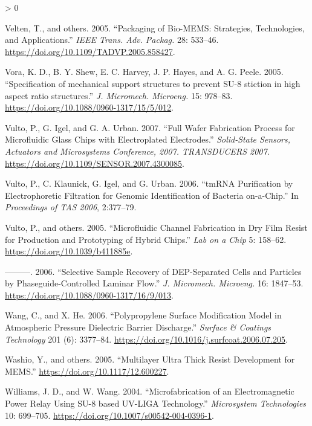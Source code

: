 \documentclass[
  10pt,
  twoside]{article}
\newlength{\cslhangindent}
\newenvironment{CSLReferences}[2] %
 {%
  \setlength{\parindent}{0pt}
  \ifodd #1 \everypar{\setlength{\hangindent}{\cslhangindent}}\ignorespaces\fi
  \ifnum #2 > 0
  \setlength{\parskip}{#2\baselineskip}
  \fi
 }%
 {}
\begin{document}
\begin{CSLReferences}{1}{0}
\leavevmode\hypertarget{ref-Velt05}{}%
Velten, T., and others. 2005. {``Packaging of Bio-MEMS: Strategies, Technologies, and Applications.''} \emph{IEEE Trans. Adv. Packag.} 28: 533--46. \url{https://doi.org/10.1109/TADVP.2005.858427}.

\leavevmode\hypertarget{ref-Vora05}{}%
Vora, K. D., B. Y. Shew, E. C. Harvey, J. P. Hayes, and A. G. Peele. 2005. {``{Specification of mechanical support structures to prevent SU-8 stiction in high aspect ratio structures}.''} \emph{J. Micromech. Microeng.} 15: 978--83. \url{https://doi.org/10.1088/0960-1317/15/5/012}.

\leavevmode\hypertarget{ref-Vult07}{}%
Vulto, P., G. Igel, and G. A. Urban. 2007. {``Full Wafer Fabrication Process for Microfluidic Glass Chips with Electroplated Electrodes.''} \emph{Solid-State Sensors, Actuators and Microsystems Conference, 2007. TRANSDUCERS 2007.} \url{https://doi.org/10.1109/SENSOR.2007.4300085}.

\leavevmode\hypertarget{ref-Vult06-2}{}%
Vulto, P., C. Klaunick, G. Igel, and G. Urban. 2006. {``{tmRNA} Purification by Electrophoretic Filtration for Genomic Identification of Bacteria on-a-Chip.''} In \emph{Proceedings of {}TAS 2006}, 2:377--79.

\leavevmode\hypertarget{ref-Vult05}{}%
Vulto, P., and others. 2005. {``Microfluidic Channel Fabrication in Dry Film Resist for Production and Prototyping of Hybrid Chips.''} \emph{Lab on a Chip} 5: 158--62. \url{https://doi.org/10.1039/b411885e}.

\leavevmode\hypertarget{ref-Vult06}{}%
---------. 2006. {``Selective Sample Recovery of DEP-Separated Cells and Particles by Phaseguide-Controlled Laminar Flow.''} \emph{J. Micromech. Microeng.} 16: 1847--53. \url{https://doi.org/10.1088/0960-1317/16/9/013}.

\leavevmode\hypertarget{ref-Wang06}{}%
Wang, C., and X. He. 2006. {``Polypropylene Surface Modification Model in Atmospheric Pressure Dielectric Barrier Discharge.''} \emph{Surface \& Coatings Technology} 201 (6): 3377--84. \url{https://doi.org/10.1016/j.surfcoat.2006.07.205}.

\leavevmode\hypertarget{ref-Wash05}{}%
Washio, Y., and others. 2005. {``Multilayer Ultra Thick Resist Development for {MEMS}.''} \url{https://doi.org/10.1117/12.600227}.

\leavevmode\hypertarget{ref-Will04}{}%
Williams, J. D., and W. Wang. 2004. {``Microfabrication of an Electromagnetic Power Relay Using {SU-8 based UV-LIGA} Technology.''} \emph{Microsystem Technologies} 10: 699--705. \url{https://doi.org/10.1007/s00542-004-0396-1}.


\end{CSLReferences}
\end{document}
